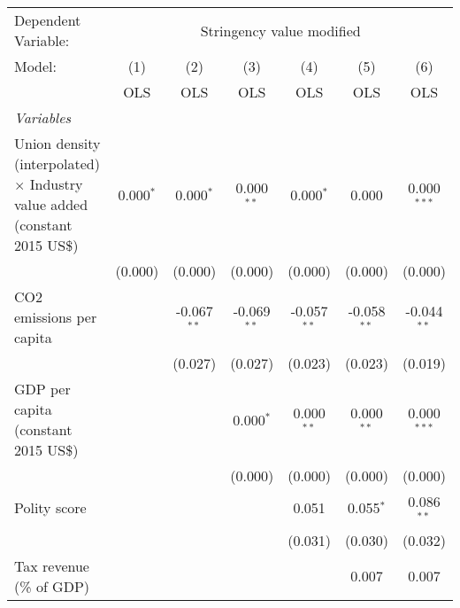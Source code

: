 
\begingroup
\centering
\begin{tabular}{lcccccc}
   \toprule
   Dependent Variable: & \multicolumn{6}{c}{Stringency value modified}\\
   Model:                                                                            & (1)         & (2)           & (3)           & (4)           & (5)           & (6)\\  
                                                                                     &  OLS        & OLS           & OLS           & OLS           & OLS           & OLS\\  
   \midrule
   \emph{Variables}\\
   Union density (interpolated) $\times$ Industry value added (constant 2015 US\$)   & 0.000$^{*}$ & 0.000$^{*}$   & 0.000$^{**}$  & 0.000$^{*}$   & 0.000         & 0.000$^{***}$\\   
                                                                                     & (0.000)     & (0.000)       & (0.000)       & (0.000)       & (0.000)       & (0.000)\\   
   CO2 emissions per capita                                                          &             & -0.067$^{**}$ & -0.069$^{**}$ & -0.057$^{**}$ & -0.058$^{**}$ & -0.044$^{**}$\\   
                                                                                     &             & (0.027)       & (0.027)       & (0.023)       & (0.023)       & (0.019)\\   
   GDP per capita (constant 2015 US\$)                                               &             &               & 0.000$^{*}$   & 0.000$^{**}$  & 0.000$^{**}$  & 0.000$^{***}$\\   
                                                                                     &             &               & (0.000)       & (0.000)       & (0.000)       & (0.000)\\   
   Polity score                                                                      &             &               &               & 0.051         & 0.055$^{*}$   & 0.086$^{**}$\\   
                                                                                     &             &               &               & (0.031)       & (0.030)       & (0.032)\\   
   Tax revenue (\% of GDP)                                                           &             &               &               &               & 0.007         & 0.007\\   

\end{tabular}
